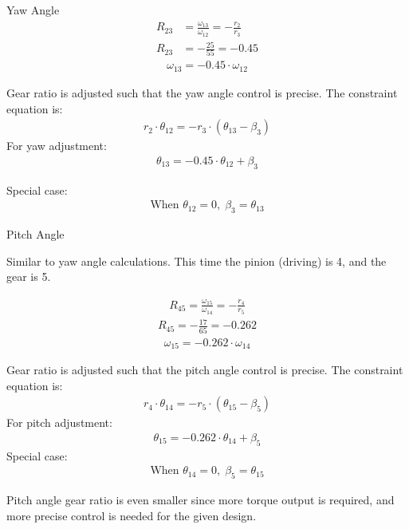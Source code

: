 \documentclass[12pt]{article}
\begin{document}
Yaw Angle
\begin{align}
    R_{23} &= \frac{\omega_{13}}{\omega_{12}} = -\frac{r_2}{r_3} \\
    R_{23} &= -\frac{25}{55} = -0.45
\end{align}
\begin{align}
    \omega_{13} = -0.45 \cdot \omega_{12}
\end{align}


Gear ratio is adjusted such that the yaw angle control is precise. The constraint equation is:
\begin{align}
r_2 \cdot \theta_{12} = -r_3 \cdot (\theta_{13} - \beta_3)
\end{align}
For yaw adjustment:
\begin{align}
    \theta_{13} = -0.45 \cdot \theta_{12} + \beta_3
\end{align}

Special case:
\begin{align}
\text{When } \theta_{12} = 0, \; \beta_3 = \theta_{13}
\end{align}

Pitch Angle

Similar to yaw angle calculations. This time the pinion (driving) is 4, and the gear is 5.

\begin{align}
R_{45} = \frac{\omega_{15}}{\omega_{14}} = -\frac{r_4}{r_5}
\end{align}
\begin{align}
R_{45} = -\frac{17}{65} = -0.262
\end{align}
\begin{align}
\omega_{15} = -0.262 \cdot \omega_{14}
\end{align}

Gear ratio is adjusted such that the pitch angle control is precise. The constraint equation is:
\begin{align}
r_4 \cdot \theta_{14} = -r_5 \cdot (\theta_{15} - \beta_5)
\end{align}
For pitch adjustment:
\begin{align}
\theta_{15} = -0.262 \cdot \theta_{14} + \beta_5
\end{align}
Special case:
\begin{align}
\text{When } \theta_{14} = 0, \; \beta_5 = \theta_{15}
\end{align}

Pitch angle gear ratio is even smaller since more torque output is required, and more precise control is needed for the given design.
\end{document}
